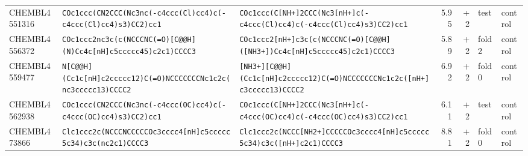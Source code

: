 \begin{longtable}{l p{4.4cm} p{4.4cm} r r l l}
CHEMBL4551316 & \texttt{COc1ccc(\allowbreak{}CN2CCC(\allowbreak{}Nc3nc(\allowbreak{}-c4ccc(\allowbreak{}Cl)\allowbreak{}cc4)\allowbreak{}c(\allowbreak{}-c4ccc(\allowbreak{}Cl)\allowbreak{}cc4)\allowbreak{}s3)\allowbreak{}CC2)\allowbreak{}cc1} & \texttt{COc1ccc(\allowbreak{}C[NH+]\allowbreak{}2CCC(\allowbreak{}Nc3[nH+]\allowbreak{}c(\allowbreak{}-c4ccc(\allowbreak{}Cl)\allowbreak{}cc4)\allowbreak{}c(\allowbreak{}-c4ccc(\allowbreak{}Cl)\allowbreak{}cc4)\allowbreak{}s3)\allowbreak{}CC2)\allowbreak{}cc1} & 5.95 & +2 & test & control \\
CHEMBL4556372 & \texttt{COc1ccc2nc3c(\allowbreak{}c(\allowbreak{}NCCCNC(\allowbreak{}=\allowbreak{}O)\allowbreak{}[C@@H]\allowbreak{}(\allowbreak{}N)\allowbreak{}Cc4c[nH]\allowbreak{}c5ccccc45)\allowbreak{}c2c1)\allowbreak{}CCCC3} & \texttt{COc1ccc2[nH+]\allowbreak{}c3c(\allowbreak{}c(\allowbreak{}NCCCNC(\allowbreak{}=\allowbreak{}O)\allowbreak{}[C@@H]\allowbreak{}(\allowbreak{}[NH3+]\allowbreak{})\allowbreak{}Cc4c[nH]\allowbreak{}c5ccccc45)\allowbreak{}c2c1)\allowbreak{}CCCC3} & 5.89 & +2 & fold 2 & control \\
CHEMBL4559477 & \texttt{N[C@@H]\allowbreak{}(\allowbreak{}Cc1c[nH]\allowbreak{}c2ccccc12)\allowbreak{}C(\allowbreak{}=\allowbreak{}O)\allowbreak{}NCCCCCCCNc1c2c(\allowbreak{}nc3ccccc13)\allowbreak{}CCCC2} & \texttt{[NH3+]\allowbreak{}[C@@H]\allowbreak{}(\allowbreak{}Cc1c[nH]\allowbreak{}c2ccccc12)\allowbreak{}C(\allowbreak{}=\allowbreak{}O)\allowbreak{}NCCCCCCCNc1c2c(\allowbreak{}[nH+]\allowbreak{}c3ccccc13)\allowbreak{}CCCC2} & 6.92 & +2 & fold 0 & control \\
CHEMBL4562938 & \texttt{COc1ccc(\allowbreak{}CN2CCC(\allowbreak{}Nc3nc(\allowbreak{}-c4ccc(\allowbreak{}OC)\allowbreak{}cc4)\allowbreak{}c(\allowbreak{}-c4ccc(\allowbreak{}OC)\allowbreak{}cc4)\allowbreak{}s3)\allowbreak{}CC2)\allowbreak{}cc1} & \texttt{COc1ccc(\allowbreak{}C[NH+]\allowbreak{}2CCC(\allowbreak{}Nc3[nH+]\allowbreak{}c(\allowbreak{}-c4ccc(\allowbreak{}OC)\allowbreak{}cc4)\allowbreak{}c(\allowbreak{}-c4ccc(\allowbreak{}OC)\allowbreak{}cc4)\allowbreak{}s3)\allowbreak{}CC2)\allowbreak{}cc1} & 6.11 & +2 & test & control \\
CHEMBL473866 & \texttt{Clc1ccc2c(\allowbreak{}NCCCNCCCCCOc3cccc4[nH]\allowbreak{}c5ccccc5c34)\allowbreak{}c3c(\allowbreak{}nc2c1)\allowbreak{}CCCC3} & \texttt{Clc1ccc2c(\allowbreak{}NCCC[NH2+]\allowbreak{}CCCCCOc3cccc4[nH]\allowbreak{}c5ccccc5c34)\allowbreak{}c3c(\allowbreak{}[nH+]\allowbreak{}c2c1)\allowbreak{}CCCC3} & 8.81 & +2 & fold 0 & control \\

\end{longtable}
